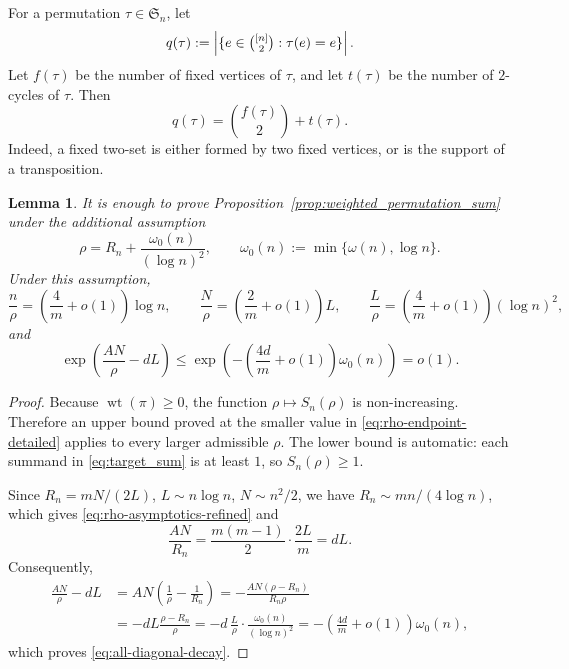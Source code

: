 \documentclass[10pt,a4paper]{amsart}
\newtheorem{lemma}[theorem]{Lemma}
\renewcommand\le{\leqslant}
\renewcommand\ge{\geqslant}
\newcommand{\wt}{\operatorname{wt}}
\begin{document}
For a permutation $\tau\in\mathfrak S_n$, let
\[
        q(\tau):=\left|\{e\in\tbinom{[n]}2:\tau(e)=e\}\right| .
\]
Let $f(\tau)$ be the number of fixed vertices of $\tau$, and let $t(\tau)$ be the number of $2$-cycles of $\tau$. Then
\begin{equation}\label{eq:q-ft-detailed}
        q(\tau)=\binom{f(\tau)}2+t(\tau).
\end{equation}
Indeed, a fixed two-set is either formed by two fixed vertices, or is the support of a transposition.

\begin{lemma}\label{lem:rho-normalization-detailed}
It is enough to prove Proposition~\ref{prop:weighted_permutation_sum} under the additional assumption
\begin{equation}\label{eq:rho-endpoint-detailed}
        \rho=R_n+\frac{\omega_0(n)}{(\log n)^2},
        \qquad \omega_0(n):=\min\{\omega(n),\log n\}.
\end{equation}
Under this assumption,
\begin{equation}\label{eq:rho-asymptotics-refined}
        \frac n\rho=\left(\frac4m+o(1)\right)\log n,
        \qquad
        \frac N\rho=\left(\frac2m+o(1)\right)L,
        \qquad
        \frac L\rho=\left(\frac4m+o(1)\right)(\log n)^2,
\end{equation}
and
\begin{equation}\label{eq:all-diagonal-decay}
        \exp\left(\frac{AN}{\rho}-dL\right)
        \le \exp\left(-\left(\frac{4d}{m}+o(1)\right)\omega_0(n)\right)=o(1).
\end{equation}
\end{lemma}

\begin{proof}
Because $\wt(\pi)\ge0$, the function $\rho\mapsto S_n(\rho)$ is non-increasing. Therefore an upper bound proved at the smaller value in \eqref{eq:rho-endpoint-detailed} applies to every larger admissible $\rho$. The lower bound is automatic: each summand in \eqref{eq:target_sum} is at least $1$, so $S_n(\rho)\ge1$.

Since $R_n=mN/(2L)$, $L\sim n\log n$, $N\sim n^2/2$, we have $R_n\sim mn/(4\log n)$, which gives \eqref{eq:rho-asymptotics-refined} and
\[
\frac{AN}{R_n}=\frac{m(m-1)}2\cdot \frac{2L}{m}=dL.
\]
Consequently,
\begin{align*}
        \frac{AN}{\rho}-dL
        &=AN\left(\frac1\rho-\frac1{R_n}\right)
          =-\frac{AN(\rho-R_n)}{R_n\rho}                    \\
        &=-dL\frac{\rho-R_n}{\rho}
          =-d\,\frac{L}{\rho}\cdot \frac{\omega_0(n)}{(\log n)^2}
          =-\left(\frac{4d}{m}+o(1)\right)\omega_0(n),
\end{align*}
which proves \eqref{eq:all-diagonal-decay}.
\end{proof}
\end{document}
